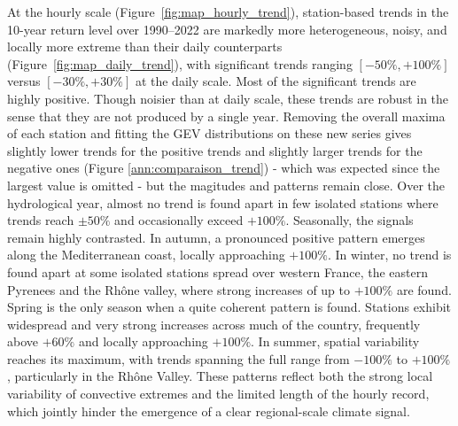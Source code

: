 \documentclass[hess, manuscript]{copernicus}
\begin{document}
At the hourly scale (Figure~\ref{fig:map_hourly_trend}), station-based trends in the 10-year return level over 1990--2022 are markedly more heterogeneous, noisy, and locally more extreme than their daily counterparts (Figure~\ref{fig:map_daily_trend}), with significant trends ranging $[-50\%, +100\%]$ versus $[-30\%, +30\%]$ at the daily scale. Most of the significant trends are highly positive.  Though noisier than at daily scale, these trends are robust in the sense that they are not produced by a single year. Removing the overall maxima of each station and fitting the GEV distributions on these new series gives slightly lower trends for the positive trends and slightly larger trends for the negative ones (Figure \ref{ann:comparaison_trend}) - which was expected since the largest value is omitted - but the magitudes and patterns remain close. Over the hydrological year, almost no trend is found apart in few isolated stations where trends reach $\pm 50\%$ and occasionally exceed $+100\%$. Seasonally, the signals remain highly contrasted. In autumn, a pronounced positive pattern emerges along the Mediterranean coast, locally approaching $+100\%$. In winter, no trend is found apart at some isolated stations spread over western France, the eastern Pyrenees and the Rhône valley, where strong increases of up to $+100\%$ are found. Spring is the only season when a quite coherent pattern is found. Stations exhibit widespread and very strong increases across much of the country, frequently above $+60\%$ and locally approaching $+100\%$. In summer, spatial variability reaches its maximum, with trends spanning the full range from $-100\%$ to $+100\%$, particularly in the Rhône Valley. These patterns reflect both the strong local variability of convective extremes and the limited length of the hourly record, which jointly hinder the emergence of a clear regional-scale climate signal.
\end{document}
